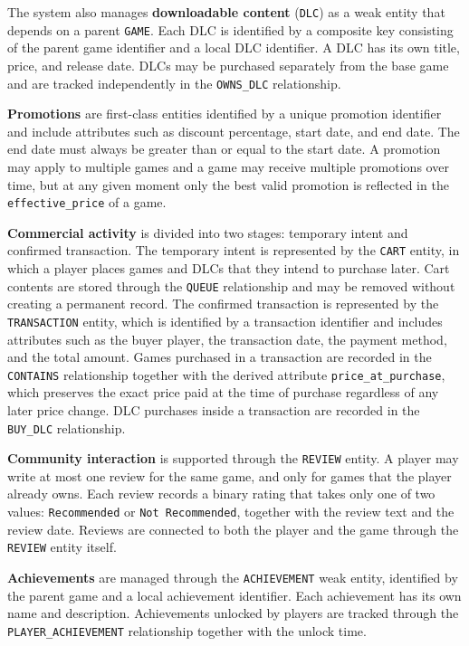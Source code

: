 The system also manages \textbf{downloadable content} (\texttt{DLC}) as a weak entity that depends on a parent \texttt{GAME}. Each DLC is identified by a composite key consisting of the parent game identifier and a local DLC identifier. A DLC has its own title, price, and release date. DLCs may be purchased separately from the base game and are tracked independently in the \texttt{OWNS\_DLC} relationship.

\textbf{Promotions} are first-class entities identified by a unique promotion identifier and include attributes such as discount percentage, start date, and end date. The end date must always be greater than or equal to the start date. A promotion may apply to multiple games and a game may receive multiple promotions over time, but at any given moment only the best valid promotion is reflected in the \texttt{effective\_price} of a game.

\textbf{Commercial activity} is divided into two stages: temporary intent and confirmed transaction. The temporary intent is represented by the \texttt{CART} entity, in which a player places games and DLCs that they intend to purchase later. Cart contents are stored through the \texttt{QUEUE} relationship and may be removed without creating a permanent record. The confirmed transaction is represented by the \texttt{TRANSACTION} entity, which is identified by a transaction identifier and includes attributes such as the buyer player, the transaction date, the payment method, and the total amount. Games purchased in a transaction are recorded in the \texttt{CONTAINS} relationship together with the derived attribute \texttt{price\_at\_purchase}, which preserves the exact price paid at the time of purchase regardless of any later price change. DLC purchases inside a transaction are recorded in the \texttt{BUY\_DLC} relationship.

\textbf{Community interaction} is supported through the \texttt{REVIEW} entity. A player may write at most one review for the same game, and only for games that the player already owns. Each review records a binary rating that takes only one of two values: \texttt{Recommended} or \texttt{Not Recommended}, together with the review text and the review date. Reviews are connected to both the player and the game through the \texttt{REVIEW} entity itself.

\textbf{Achievements} are managed through the \texttt{ACHIEVEMENT} weak entity, identified by the parent game and a local achievement identifier. Each achievement has its own name and description. Achievements unlocked by players are tracked through the \texttt{PLAYER\_ACHIEVEMENT} relationship together with the unlock time.

